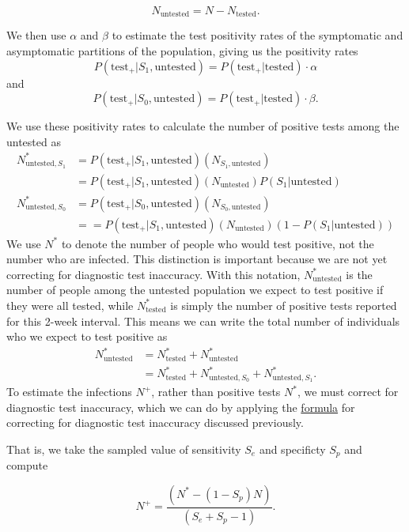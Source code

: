 \documentclass[12pt,twoside]{smiththesis}
\begin{document}
\[ N_{\text{untested}} =  N - N_{\text{tested}} .\]

We then use \(\alpha\) and \(\beta\) to estimate the test positivity rates of the symptomatic and asymptomatic partitions of the population, giving us the positivity rates
\[ P( \text{test}_+ | S_1, \text{untested})  = P( \text{test}_+ | \text{tested}) \cdot  \alpha  \]
and
\[ P( \text{test}_+ | S_0, \text{untested})  = P( \text{test}_+ | \text{tested}) \cdot  \beta. \]

We use these positivity rates to calculate the number of positive tests among the untested as
\begin{align*}
N^*_{\text{untested},S_1} &= P( \text{test}_+ | S_1, \text{untested}) ( N_{S_1,\text{untested}}) \\
&= P( \text{test}_+ | S_1, \text{untested}) (N_{\text{untested}} ) P(S_1|\text{untested})\\
N^*_{\text{untested},S_0} &= P( \text{test}_+ | S_0, \text{untested}) ( N_{S_0,\text{untested}})\\
&== P( \text{test}_+ | S_1, \text{untested}) (N_{\text{untested}} ) (1- P(S_1|\text{untested}))
\end{align*}
We use \(N^*\) to denote the number of people who would test positive, not the number who are infected. This distinction is important because we are not yet correcting for diagnostic test inaccuracy. With this notation, \(N^*_{\text{untested}}\) is the number of people among the untested population we expect to test positive if they were all tested, while \(N^*_{\text{tested}}\) is simply the number of positive tests reported for this 2-week interval. This means we can write the total number of individuals who we expect to test positive as
\begin{align*}
 N^*_{\text{untested}}
 &= N^*_{\text{tested}} + N^*_{\text{untested}} \\
 &= N^*_{\text{tested}} + N^*_{\text{untested}, S_0} + N^*_{\text{untested}, S_1}.
\end{align*}
To estimate the infections \(N^+\), rather than positive tests \(N^*\), we must correct for diagnostic test inaccuracy, which we can do by applying the \protect\hyperlink{correct-test-inaccuracy}{formula} for correcting for diagnostic test inaccuracy discussed previously.

That is, we take the sampled value of sensitivity \(S_e\) and specificty \(S_p\) and compute

\[N^+ = \dfrac{(N^* - (1 - S_p) N) } { (S_e + S_p - 1) }.\]
\end{document}
